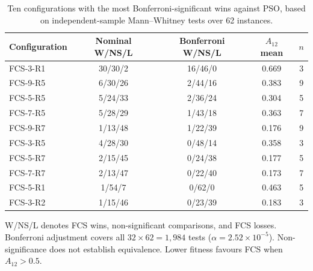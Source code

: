 \begin{table}[h]
\centering
\small
\caption{Ten configurations with the most Bonferroni-significant wins against PSO, based on independent-sample Mann--Whitney tests over 62 instances.}
\label{tab:h4_wilcoxon}
\setlength{\tabcolsep}{6pt}
\renewcommand{\arraystretch}{1.18}
\begin{tabularx}{\textwidth}{>{\raggedright\arraybackslash}Xcccc}
\toprule
\textbf{Configuration} & \textbf{Nominal W/NS/L} & \textbf{Bonferroni W/NS/L} & \boldmath$A_{12}$ \textbf{mean} & \textbf{$n$} \\
\midrule
FCS-3-R1 & 30/30/2 & 16/46/0 & 0.669 & 3 \\
FCS-9-R5 & 6/30/26 & 2/44/16 & 0.383 & 9 \\
FCS-5-R5 & 5/24/33 & 2/36/24 & 0.304 & 5 \\
FCS-7-R5 & 5/28/29 & 1/43/18 & 0.363 & 7 \\
FCS-9-R7 & 1/13/48 & 1/22/39 & 0.176 & 9 \\
FCS-3-R5 & 4/28/30 & 0/48/14 & 0.358 & 3 \\
FCS-5-R7 & 2/15/45 & 0/24/38 & 0.177 & 5 \\
FCS-7-R7 & 2/13/47 & 0/22/40 & 0.173 & 7 \\
FCS-5-R1 & 1/54/7 & 0/62/0 & 0.463 & 5 \\
FCS-3-R2 & 1/15/46 & 0/23/39 & 0.183 & 3 \\
\bottomrule
\end{tabularx}
\noindent\footnotesize
W/NS/L denotes FCS wins, non-significant comparisons, and FCS losses. Bonferroni adjustment covers all $32\times62=1,984$ tests ($\alpha=2.52\times10^{-5}$). Non-significance does not establish equivalence. Lower fitness favours FCS when $A_{12}>0.5$.
\end{table}
